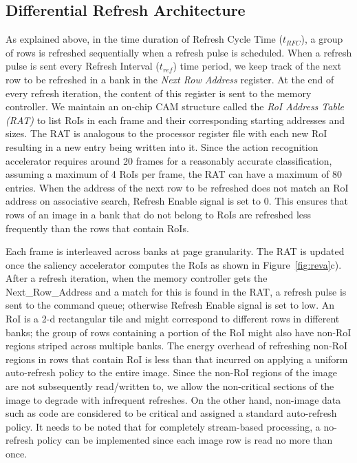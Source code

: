 \subsection{Differential Refresh Architecture}
As explained above, in the time duration of Refresh Cycle Time ($t_{RFC}$), a group of rows is refreshed sequentially when a refresh pulse is scheduled. When a refresh pulse is sent every Refresh Interval ($t_{ref}$) time period, we keep track of the next row to be refreshed in a bank in the \emph{Next Row Address} register. At the end of every refresh iteration, the content of this register is sent to the memory controller. 
We maintain an on-chip CAM structure called the \emph{RoI Address Table (RAT)} to list RoIs in each frame and their corresponding starting addresses and sizes. The RAT is analogous to the processor register file with each new RoI resulting in a new entry being written into it. 
Since the action recognition accelerator requires around 20 frames for a reasonably accurate classification, assuming a maximum of 4 RoIs per frame, the RAT can have a maximum of 80 entries. When the address of the next row to be refreshed does not match an RoI address on associative search, Refresh Enable signal is set to 0. This ensures that rows of an image in a bank that do not belong to RoIs are refreshed less frequently than the rows that contain RoIs. 

Each frame is interleaved across banks at page granularity. The RAT is updated once the saliency accelerator computes the RoIs as shown in Figure~\ref{fig:reva}c). After a refresh iteration, when the memory controller gets the Next\_Row\_Address and a match for this is found in the RAT, a refresh pulse is sent to the command queue; otherwise Refresh Enable signal is set to low. An RoI is a 2-d rectangular tile and might correspond to different rows in different banks; the group of rows containing a portion of the RoI might also have non-RoI regions striped across multiple banks. The energy overhead of refreshing non-RoI regions in rows that contain RoI is less than that incurred on applying a uniform auto-refresh policy to the entire image. Since the non-RoI regions of the image are not subsequently read/written to, we allow the non-critical sections of the image to degrade with infrequent refreshes. On the other hand, non-image data such as code are considered to be critical and assigned a standard auto-refresh policy. It needs to be noted that for completely stream-based processing, a no-refresh policy can be implemented since each image row is read no more than once.
 
